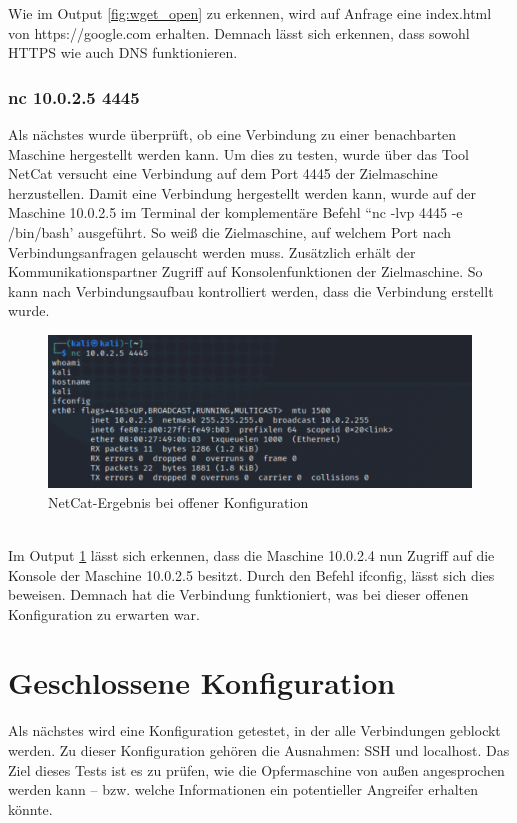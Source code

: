 Wie im Output \ref*{fig:wget_open} zu erkennen, wird auf Anfrage eine index.html von https://google.com erhalten. Demnach lässt sich erkennen, dass sowohl HTTPS wie auch DNS funktionieren. 

\subsubsection*{nc 10.0.2.5 4445}
Als nächstes wurde überprüft, ob eine Verbindung zu einer benachbarten Maschine hergestellt werden kann. Um dies zu testen, wurde über das Tool NetCat versucht eine Verbindung auf dem Port 4445 der Zielmaschine herzustellen. Damit eine Verbindung hergestellt werden kann, wurde auf der Maschine 10.0.2.5 im Terminal der komplementäre Befehl ``nc -lvp 4445 -e /bin/bash' ausgeführt. So weiß die Zielmaschine, auf welchem Port nach Verbindungsanfragen gelauscht werden muss. Zusätzlich erhält der Kommunikationspartner Zugriff auf Konsolenfunktionen der Zielmaschine. So kann nach Verbindungsaufbau kontrolliert werden, dass die Verbindung erstellt wurde. 
\begin{figure}
	\includegraphics[width=\linewidth]{img/open_nc.png}
	\caption{NetCat-Ergebnis bei offener Konfiguration}
	\label{fig:nc_open}
\end{figure}
\\Im Output \ref{fig:nc_open} lässt sich erkennen, dass die Maschine 10.0.2.4 nun Zugriff auf die Konsole der Maschine 10.0.2.5 besitzt. Durch den Befehl ifconfig, lässt sich dies beweisen. Demnach hat die Verbindung funktioniert, was bei dieser offenen Konfiguration zu erwarten war. 
\section{Geschlossene Konfiguration}
Als nächstes wird eine Konfiguration getestet, in der alle Verbindungen geblockt werden. Zu dieser Konfiguration gehören die Ausnahmen: SSH und localhost. Das Ziel dieses Tests ist es zu prüfen, wie die Opfermaschine von außen angesprochen werden kann – bzw. welche Informationen ein potentieller Angreifer erhalten könnte.
 
